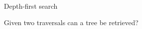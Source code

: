 \documentclass{beamer}
\begin{document}
\begin{frame}{Depth-first search}
  \begin{overlayarea}{\textwidth}{\textheight}
  \vspace{-12pt}
  \begin{block}{Given two traversals can a tree be retrieved?}
  \end{block}
  
  \vspace{-7pt}
  

\end{overlayarea}
\end{frame}
\end{document}
